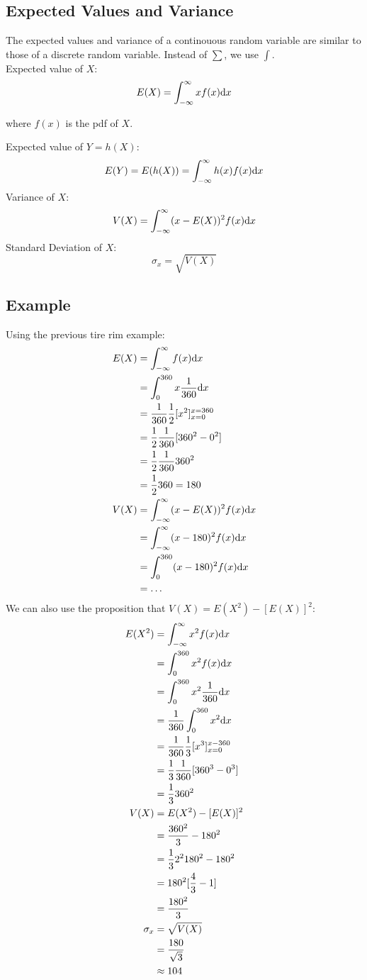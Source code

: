\documentclass{math}
\begin{document}
\subsection*{Expected Values and Variance}
The expected values and variance of a continouous random variable are similar
to those of a discrete random variable. Instead of \( \sum \), we use
\( \int \). \\
Expected value of \( X \):
\[ E(X) = \int_{-\infty}^{\infty}xf(x)\mathrm{d}{x} \]
\begin{center}
where \( f(x) \) is the pdf of \( X \).
\end{center}
Expected value of \( Y = h(X) \):
\[ E(Y) = E(h(X)) = \int_{-\infty}^{\infty}h(x)f(x)\mathrm{d}{x} \]
Variance of \( X \):
\[ V(X) = \int_{-\infty}^{\infty}(x-E(X))^{2}f(x)\mathrm{d}{x} \]
Standard Deviation of \( X \):
\[ \sigma_{x} = \sqrt{V(X)} \]

\subsection*{Example}
Using the previous tire rim example:
\begin{align*}
  E(X) &= \int_{-\infty}^{\infty}f(x)\mathrm{d}{x} \\
  &= \int_{0}^{360}x\frac{1}{360}\mathrm{d}{x} \\
  &= \frac{1}{360}\frac{1}{2}[x^{2}]_{x=0}^{x=360} \\
  &= \frac{1}{2}\frac{1}{360}[360^{2}-0^{2}] \\
  &= \frac{1}{2}\frac{1}{360}360^{2} \\
  &= \frac{1}{2}360 = 180 \\
  V(X) &= \int_{-\infty}^{\infty}(x-E(X))^{2}f(x)\mathrm{d}{x} \\
  &= \int_{-\infty}^{\infty}(x-180)^{2}f(x)\mathrm{d}{x} \\
  &= \int_{0}^{360}(x-180)^{2}f(x)\mathrm{d}{x} \\
  &= \dots
\end{align*}
We can also use the proposition that \( V(X) = E(X^{2})-[E(X)]^{2} \):
\begin{align*}
  E(X^{2}) &= \int_{-\infty}^{\infty}x^{2}f(x)\mathrm{d}{x} \\
  &= \int_{0}^{360}x^{2}f(x)\mathrm{d}{x} \\
  &= \int_{0}^{360}x^{2}\frac{1}{360}\mathrm{d}{x} \\
  &= \frac{1}{360}\int_{0}^{360}x^{2}\mathrm{d}{x} \\
  &= \frac{1}{360}\frac{1}{3}[x^{3}]_{x=0}^{x-360} \\
  &= \frac{1}{3}\frac{1}{360}[360^{3}-0^{3}] \\
  &= \frac{1}{3}360^{2} \\
  V(X) &= E(X^{2})-[E(X)]^{2} \\
  &= \frac{360^{2}}{3}-180^{2} \\
  &= \frac{1}{3}2^{2}180^{2}-180^{2} \\
  &= 180^{2}[\frac{4}{3}-1] \\
  &= \frac{180^{2}}{3} \\
  \sigma_{x} &= \sqrt{V(X)} \\
  &= \frac{180}{\sqrt{3}} \\
  &\approx 104
\end{align*}
\end{document}

